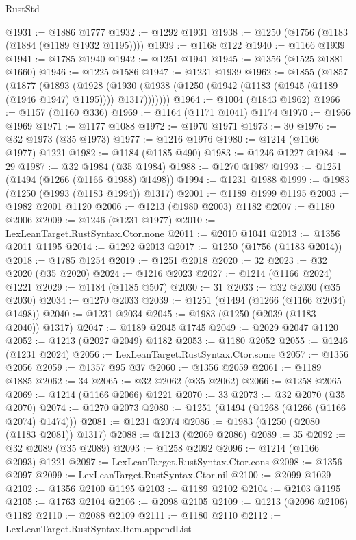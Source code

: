 \begin{lexlean}{RustStd}
\begin{coremodule}
@1931 := @1886 @1777
@1932 := @1292 @1931
@1938 := @1250 (@1756 (@1183 (@1884 (@1189 @1932 @1195))))
@1939 := @1168 @122
@1940 := @1166 @1939
@1941 := @1785 @1940
@1942 := @1251 @1941
@1945 := @1356 (@1525 @1881 @1660)
@1946 := @1225 @1586
@1947 := @1231 @1939
@1962 := @1855
    (@1857
      (@1877
        (@1893
          (@1928
            (@1930 (@1938 (@1250 (@1942 (@1183 (@1945 (@1189 (@1946 @1947) @1195)))) @1317)))))))
@1964 := @1004 (@1843 @1962)
@1966 := @1157 (@1160 @336)
@1969 := @1164 (@1171 @1041) @1174
@1970 := @1966 @1969
@1971 := @1177 @1088
@1972 := @1970 @1971
@1973 := 30
@1976 := @32 @1973 (@35 @1973)
@1977 := @1216 @1976
@1980 := @1214 (@1166 @1977) @1221
@1982 := @1184 (@1185 @490)
@1983 := @1246 @1227
@1984 := 29
@1987 := @32 @1984 (@35 @1984)
@1988 := @1270 @1987
@1993 := @1251 (@1494 (@1266 (@1166 @1988) @1498))
@1994 := @1231 @1988
@1999 := @1983 (@1250 (@1993 (@1183 @1994)) @1317)
@2001 := @1189 @1999 @1195
@2003 := @1982 @2001 @1120
@2006 := @1213 (@1980 @2003) @1182
@2007 := @1180 @2006
@2009 := @1246 (@1231 @1977)
@2010 := LexLeanTarget.RustSyntax.Ctor.none
@2011 := @2010 @1041
@2013 := @1356 @2011 @1195
@2014 := @1292 @2013
@2017 := @1250 (@1756 (@1183 @2014))
@2018 := @1785 @1254
@2019 := @1251 @2018
@2020 := 32
@2023 := @32 @2020 (@35 @2020)
@2024 := @1216 @2023
@2027 := @1214 (@1166 @2024) @1221
@2029 := @1184 (@1185 @507)
@2030 := 31
@2033 := @32 @2030 (@35 @2030)
@2034 := @1270 @2033
@2039 := @1251 (@1494 (@1266 (@1166 @2034) @1498))
@2040 := @1231 @2034
@2045 := @1983 (@1250 (@2039 (@1183 @2040)) @1317)
@2047 := @1189 @2045 @1745
@2049 := @2029 @2047 @1120
@2052 := @1213 (@2027 @2049) @1182
@2053 := @1180 @2052
@2055 := @1246 (@1231 @2024)
@2056 := LexLeanTarget.RustSyntax.Ctor.some
@2057 := @1356 @2056
@2059 := @1357 @95 @37
@2060 := @1356 @2059
@2061 := @1189 @1885
@2062 := 34
@2065 := @32 @2062 (@35 @2062)
@2066 := @1258 @2065
@2069 := @1214 (@1166 @2066) @1221
@2070 := 33
@2073 := @32 @2070 (@35 @2070)
@2074 := @1270 @2073
@2080 := @1251 (@1494 (@1268 (@1266 (@1166 @2074) @1474)))
@2081 := @1231 @2074
@2086 := @1983 (@1250 (@2080 (@1183 @2081)) @1317)
@2088 := @1213 (@2069 @2086)
@2089 := 35
@2092 := @32 @2089 (@35 @2089)
@2093 := @1258 @2092
@2096 := @1214 (@1166 @2093) @1221
@2097 := LexLeanTarget.RustSyntax.Ctor.cons
@2098 := @1356 @2097
@2099 := LexLeanTarget.RustSyntax.Ctor.nil
@2100 := @2099 @1029
@2102 := @1356 @2100 @1195
@2103 := @1189 @2102
@2104 := @2103 @1195
@2105 := @1763 @2104
@2106 := @2098 @2105
@2109 := @1213 (@2096 @2106) @1182
@2110 := @2088 @2109
@2111 := @1180 @2110
@2112 := LexLeanTarget.RustSyntax.Item.appendList

\end{coremodule}
\end{lexlean}

